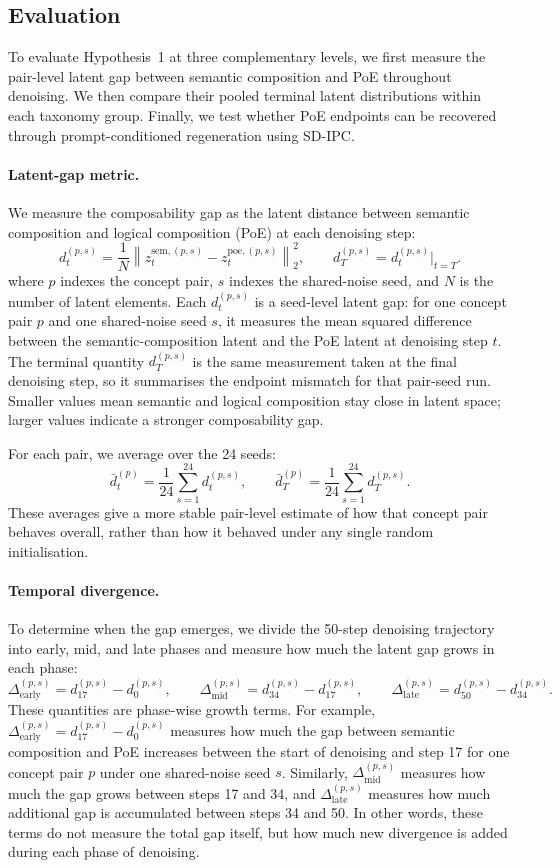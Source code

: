 \subsection{Evaluation}
\label{subsec:p1_eval}
To evaluate Hypothesis~1 at three complementary levels, we first measure the pair-level latent gap between semantic composition and PoE throughout denoising. 
We then compare their pooled terminal latent distributions within each taxonomy group. 
Finally, we test whether PoE endpoints can be recovered through prompt-conditioned regeneration using SD-IPC.

\paragraph{Latent-gap metric.}
We measure the composability gap as the latent distance between semantic composition and logical composition (PoE) at each denoising step:
\[
d_t^{(p,s)}=\frac{1}{N}\left\|z_t^{\mathrm{sem},(p,s)}-z_t^{\mathrm{poe},(p,s)}\right\|_2^2,
\qquad
d_T^{(p,s)}=d_t^{(p,s)}\big|_{t=T}.
\]
where \(p\) indexes the concept pair, \(s\) indexes the shared-noise seed, and \(N\) is the number of latent elements.
Each \(d_t^{(p,s)}\) is a seed-level latent gap: for one concept pair \(p\) and one shared-noise seed \(s\), it measures the mean squared difference between the semantic-composition latent and the PoE latent at denoising step \(t\). 
The terminal quantity \(d_T^{(p,s)}\) is the same measurement taken at the final denoising step, so it summarises the endpoint mismatch for that pair-seed run. 
Smaller values mean semantic and logical composition stay close in latent space; larger values indicate a stronger composability gap.

For each pair, we average over the 24 seeds:
\[
\bar d_t^{(p)}=\frac{1}{24}\sum_{s=1}^{24} d_t^{(p,s)},
\qquad
\bar d_T^{(p)}=\frac{1}{24}\sum_{s=1}^{24} d_T^{(p,s)}.
\]
These averages give a more stable pair-level estimate of how that concept pair behaves overall, rather than how it behaved under any single random initialisation.

\paragraph{Temporal divergence.}
To determine when the gap emerges, we divide the 50-step denoising trajectory into early, mid, and late phases and measure how much the latent gap grows in each phase:
\[
\Delta_{\mathrm{early}}^{(p,s)}=d_{17}^{(p,s)}-d_0^{(p,s)},
\qquad
\Delta_{\mathrm{mid}}^{(p,s)}=d_{34}^{(p,s)}-d_{17}^{(p,s)},
\qquad
\Delta_{\mathrm{late}}^{(p,s)}=d_{50}^{(p,s)}-d_{34}^{(p,s)}.
\]
These quantities are phase-wise growth terms. 
For example, \(\Delta_{\mathrm{early}}^{(p,s)}=d_{17}^{(p,s)}-d_0^{(p,s)}\) measures how much the gap between semantic composition and PoE increases between the start of denoising and step 17 for one concept pair \(p\) under one shared-noise seed \(s\). 
Similarly, \(\Delta_{\mathrm{mid}}^{(p,s)}\) measures how much the gap grows between steps 17 and 34, and \(\Delta_{\mathrm{late}}^{(p,s)}\) measures how much additional gap is accumulated between steps 34 and 50. 
In other words, these terms do not measure the total gap itself, but how much new divergence is added during each phase of denoising.

